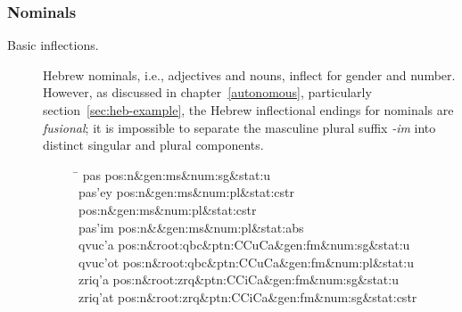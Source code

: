 \subsubsection{Nominals}
\begin{description}
\item[Basic inflections.] Hebrew nominals, i.e., adjectives and nouns, 
inflect for gender and number. However, as discussed in chapter~\ref{autonomous}, 
particularly section~\ref{sec:heb-example}, the Hebrew inflectional endings 
for nominals are \emph{fusional}; it is impossible to separate the  masculine plural suffix \textit{-im} into 
distinct singular and plural components.

\begin{figure}[ht]
\begin{mdframed}
\begin{tabbing}
\hspace{1in} \= \hspace{5.5in} \kill
pas \> pos:n\&gen:ms\&num:sg\&stat:u\\
pas\a'{e}y \> pos:n\&gen:ms\&num:pl\&stat:cstr pos:n\&gen:ms\&num:pl\&stat:cstr\\
pas\a'{i}m \> pos:n\&\&gen:ms\&num:pl\&stat:abs\\
qvuc\a'{a} \> pos:n\&root:qbc\&ptn:CCuCa\&gen:fm\&num:sg\&stat:u\\
qvuc\a'{o}t \> pos:n\&root:qbc\&ptn:CCuCa\&gen:fm\&num:pl\&stat:u \\
zriq\a'{a} \> pos:n\&root:zrq\&ptn:CCiCa\&gen:fm\&num:sg\&stat:u \\
zriq\a'{a}t	 \> pos:n\&root:zrq\&ptn:CCiCa\&gen:fm\&num:sg\&stat:cstr \\

\end{tabbing}
\end{mdframed}
\end{figure}
\end{description}

